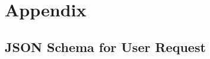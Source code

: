 %
%
%                 

\chapter{Appendix}
\label{sec:appendixa}



\section{JSON Schema for User Request}
